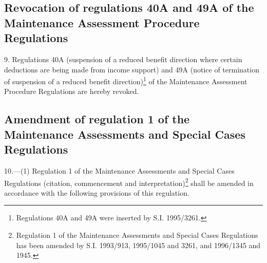 \documentclass[12pt,a4paper]{article}
\begin{document}
\subsection[9. Revocation of regulations 40A and 49A of the Maintenance Assessment Procedure Regulations]{Revocation of regulations 40A and 49A of the Maintenance Assessment Procedure Regulations}

9.  Regulations 40A (suspension of a reduced benefit direction where certain deductions are being made from income support) and 49A (notice of termination of suspension of a reduced benefit direction)\footnote{\frenchspacing Regulations 40A and 49A were inserted by S.I. 1995/3261.} of the Maintenance Assessment Procedure Regulations are hereby revoked.

\subsection[10. Amendment of regulation 1 of the Maintenance Assessments and Special Cases Regulations]{\sloppy Amendment of regulation 1 of the Maintenance Assessments and Special Cases Regulations}

\begin{sloppypar}
10.—(1) Regulation 1 of the Maintenance Assessments and Special Cases Regulations (citation, commencement and interpretation)\footnote{\frenchspacing Regulation 1 of the Maintenance Assessments and Special Cases Regulations has been amended by S.I. 1993/913, 1995/1045 and 3261, and 1996/1345 and 1945.} shall be amended in accordance with the following provisions of this regulation.
\end{sloppypar}
\end{document}
